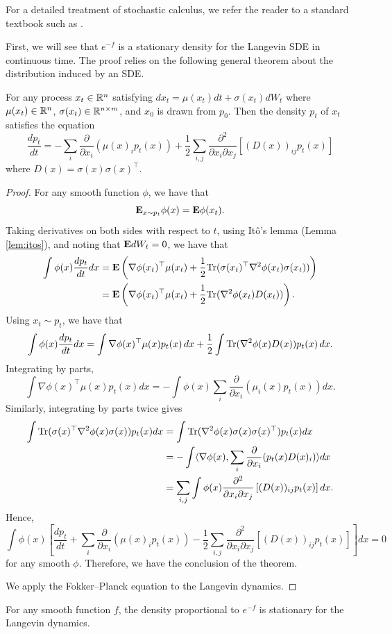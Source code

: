 For a detailed treatment of stochastic calculus, we refer the reader
to a standard textbook such as \cite{oksendal2013stochastic}. 

First, we will see that $e^{-f}$ is a stationary density for the
Langevin SDE in continuous time. The proof relies on the following
general theorem about the distribution induced by an SDE.
\begin{thm}
\label{thm:fokker_planck}For any process $x_{t}\in\mathbb{R}^{n}$ satisfying
$dx_{t}=\mu(x_{t})dt+\sigma(x_{t})dW_{t}$ where $\mu(x_{t})\in\mathbb{R}^{n}$,
$\sigma(x_{t})\in\mathbb{R}^{n\times m}$, and $x_{0}$ is drawn from $p_{0}$.
Then the density $p_{t}$ of $x_{t}$ satisfies the equation
\[
\frac{dp_{t}}{dt}=-\sum_{i}\frac{\partial}{\partial x_{i}}(\mu(x)_{i}p_{t}(x))+\frac{1}{2}\sum_{i,j}\frac{\partial^{2}}{\partial x_{i}\partial x_{j}}\left[(D(x))_{ij}p_{t}(x)\right]
\]
where $D(x)=\sigma(x)\sigma(x)^{\top}$.
\end{thm}

\begin{proof}
For any smooth function $\phi$, we have that
\[
\mathbf{E}_{x\sim p_{t}}\phi(x)=\mathbf{E}\phi(x_{t}).
\]
Taking derivatives on both sides with respect to $t$, using It\^{o}'s
lemma (Lemma \ref{lem:itos}), and noting that $\mathbf{E} dW_{t}=0$, we
have that
\begin{align*}
\int\phi(x)\frac{dp_{t}}{dt}dx & =\mathbf{E}\left(\nabla\phi(x_{t})^{\top}\mu(x_{t})+\frac{1}{2}\mathrm{Tr}(\sigma(x_{t})^{\top}\nabla^{2}\phi(x_{t})\sigma(x_{t}))\right)\\
 & =\mathbf{E}\left(\nabla\phi(x_{t})^{\top}\mu(x_{t})+\frac{1}{2}\mathrm{Tr}(\nabla^{2}\phi(x_{t})D(x_{t}))\right).
\end{align*}
Using $x_{t}\sim p_{t}$, we have that
\[
\int\phi(x)\frac{dp_{t}}{dt}dx=\int\nabla\phi(x)^{\top}\mu(x)p_{t}(x)\,dx+\frac{1}{2}\int\mathrm{Tr}(\nabla^{2}\phi(x)D(x))p_{t}(x)\,dx.
\]
Integrating by parts, 
\[
\int\nabla\phi(x)^{\top}\mu(x)p_{t}(x)dx=-\int\phi(x)\sum_{i}\frac{\partial}{\partial x_{i}}(\mu_{i}(x)p_{t}(x))dx.
\]
Similarly, integrating by parts twice gives
\begin{align*}
\int\mathrm{Tr}(\sigma(x)^{\top}\nabla^{2}\phi(x)\sigma(x))p_{t}(x)dx & =\int\mathrm{Tr}(\nabla^{2}\phi(x)\sigma(x)\sigma(x)^{\top})p_{t}(x)dx\\
 & =-\int\langle\nabla\phi(x),\sum_{i}\frac{\partial}{\partial x_{i}}(p_{t}(x)D(x)_{i})\rangle dx\\
 & =\sum_{i,j}\int\phi(x)\frac{\partial^{2}}{\partial x_{i}\partial x_{j}}\left[(D(x))_{ij}p_{t}(x)\right]dx.
\end{align*}
Hence, 
\[
\int\phi(x)\left[\frac{dp_{t}}{dt}+\sum_{i}\frac{\partial}{\partial x_{i}}(\mu(x)_{i}p_{t}(x))-\frac{1}{2}\sum_{i,j}\frac{\partial^{2}}{\partial x_{i}\partial x_{j}}\left[(D(x))_{ij}p_{t}(x)\right]\right]dx=0
\]
for any smooth $\phi$. Therefore, we have the conclusion of the theorem.

We apply the Fokker--Planck equation to the Langevin dynamics.
\end{proof}
\begin{thm}
\label{thm:langevin_stationary}For any smooth function $f$, the
density proportional to $e^{-f}$ is stationary for the Langevin dynamics.
\end{thm}

